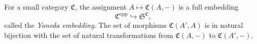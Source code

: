 For a small category $\mathfrak{C}$, the assignment $A \mapsto \mathfrak{C}(A, -)$ is a full embedding
$$
\mathfrak{C}^{\text{opp}} \hookrightarrow \mathfrak{S}^{\mathfrak{C}},
$$
called the \textit{Yoneda embedding}. The set of morphisms $\mathfrak{C}(A', A)$ is in natural bijection with the set of natural transformations from $\mathfrak{C}(A, -)$ to $\mathfrak{C}(A', -)$.
